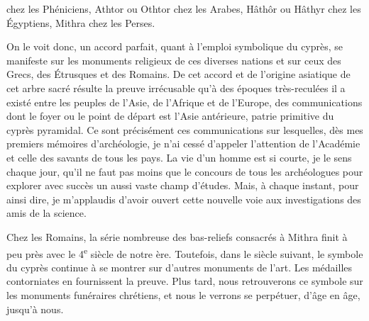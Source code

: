 \documentclass{article}
\begin{document}
chez les Phéniciens, Athtor ou Othtor chez les Arabes, Hâthôr ou Hâthyr chez les Égyptiens, Mithra chez les Perses.

On le voit donc, un accord parfait, quant à l'emploi symbolique du cyprès, se manifeste sur les monuments religieux de ces diverses nations et sur ceux des Grecs, des Étrusques et des Romains. De cet accord et de l'origine asiatique de cet arbre sacré résulte la preuve irrécusable qu'à des époques très-reculées il a existé entre les peuples de l'Asie, de l'Afrique et de l'Europe, des communications dont le foyer ou le point de départ est l'Asie antérieure, patrie primitive du cyprès pyramidal. Ce sont précisément ces communications sur lesquelles, dès mes premiers mémoires d'archéologie, je n'ai cessé d'appeler l'attention de l'Académie et celle des savants de tous les pays. La vie d'un homme est si courte, je le sens chaque jour, qu'il ne faut pas moins que le concours de tous les archéologues pour explorer avec succès un aussi vaste champ d'études. Mais, à chaque instant, pour ainsi dire, je m'applaudis d'avoir ouvert cette nouvelle voie aux investigations des amis de la science.

Chez les Romains, la série nombreuse des bas-reliefs consacrés à Mithra finit à peu près avec le 4\textsuperscript{e} siècle de notre ère. Toutefois, dans le siècle suivant, le symbole du cyprès continue à se montrer sur d'autres monuments de l'art. Les médailles contorniates en fournissent la preuve. Plus tard, nous retrouverons ce symbole sur les monuments funéraires chrétiens, et nous le verrons se perpétuer, d'âge en âge, jusqu'à nous.
\end{document}
